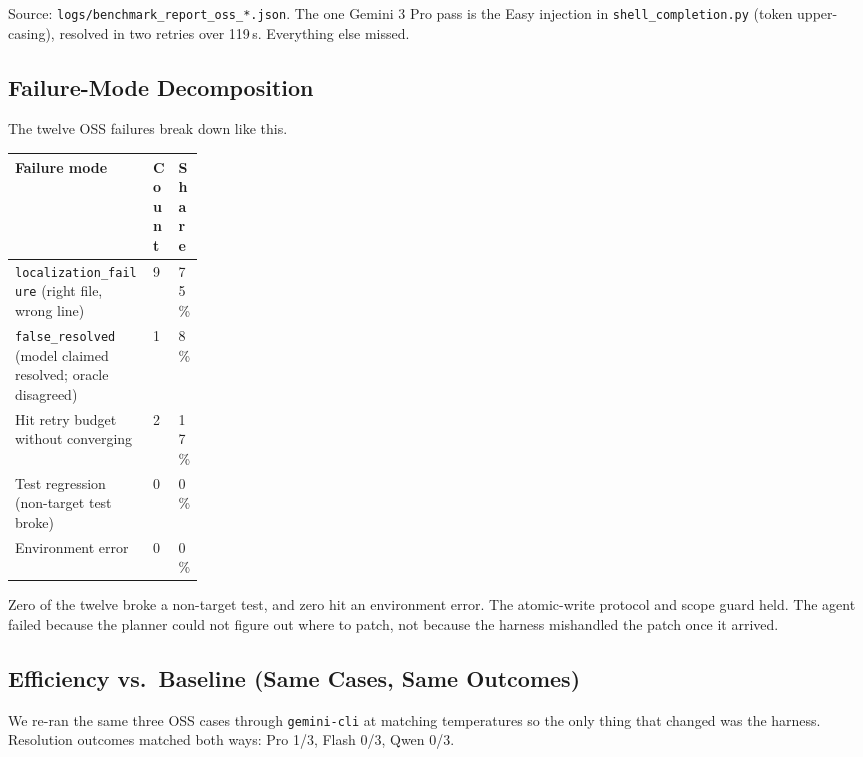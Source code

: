\documentclass[11pt,letterpaper]{article}
\begin{document}
Source: \texttt{logs/benchmark\_report\_oss\_*.json}. The one Gemini 3 Pro pass is the Easy injection in \texttt{shell\_completion.py} (token upper-casing), resolved in two retries over 119\,s. Everything else missed.

\subsection{Failure-Mode Decomposition}

The twelve OSS failures break down like this.

\begin{tabularx}{\linewidth}{X R{0.12\linewidth} R{0.10\linewidth}}
\toprule
\textbf{Failure mode} & \textbf{Count} & \textbf{Share} \\
\midrule
\texttt{localization\_failure} (right file, wrong line) & 9 & 75\,\% \\
\texttt{false\_resolved} (model claimed resolved; oracle disagreed) & 1 &  8\,\% \\
Hit retry budget without converging & 2 & 17\,\% \\
Test regression (non-target test broke) & 0 &  0\,\% \\
Environment error & 0 &  0\,\% \\
\bottomrule
\end{tabularx}

Zero of the twelve broke a non-target test, and zero hit an environment error. The atomic-write protocol and scope guard held. The agent failed because the planner could not figure out where to patch, not because the harness mishandled the patch once it arrived.

\subsection{Efficiency vs.\ Baseline (Same Cases, Same Outcomes)}

We re-ran the same three OSS cases through \texttt{gemini-cli} at matching temperatures so the only thing that changed was the harness. Resolution outcomes matched both ways: Pro 1/3, Flash 0/3, Qwen 0/3.
\end{document}
